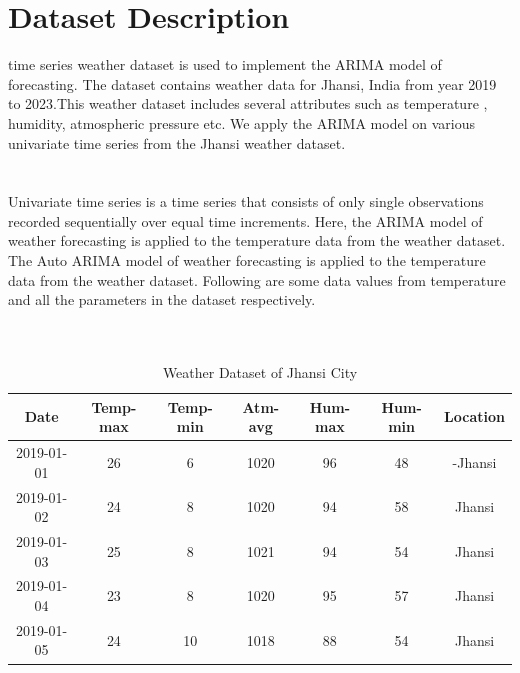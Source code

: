 \section {Dataset Description}
 time series weather dataset is used to implement the ARIMA model of forecasting. The dataset contains weather data for Jhansi, India from year 2019 to 2023.This weather dataset includes several attributes such as temperature , humidity, atmospheric pressure etc. We apply the ARIMA model on various univariate time series from the Jhansi weather dataset.
 \\
 \\
 \\
Univariate time series is a time series that consists of only single observations recorded sequentially over equal time increments. Here, the ARIMA model of weather forecasting is applied to the temperature data from the weather dataset. The Auto ARIMA model of weather forecasting is applied to the temperature data from the weather dataset. Following are some data values from temperature and all the parameters in the  dataset respectively.
\\
\\
\\
 \begin{table}[htbp]
 \caption{Weather Dataset of Jhansi City}
     \begin{tabular}{@{}ccccccc@{}}
     \toprule
     Date & Temp-max & Temp-min 	& Atm-avg & Hum-max & Hum-min & Location\\
     \midrule
   2019-01-01 &26 & 6 & 1020 &	96 & 48 &	-Jhansi\\
   
2019-01-02	& 24 &	8 &	1020 &	94 & 58&	Jhansi\\

    2019-01-03& 25 & 8  & 1021 & 94  & 54 &	Jhansi\\
    
    2019-01-04 &23 & 8 & 1020 &	95 & 57& Jhansi\\
    
    2019-01-05 &24&	10&1018& 88& 54& Jhansi\\
    \bottomrule
     \end{tabular}
 \end{table}  
